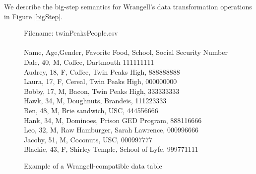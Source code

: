 \documentclass[preprint,nocopyrightspace]{sig-alternate}
\begin{document}
We describe the big-step semantics for Wrangell's data transformation operations in Figure \ref{bigStep}.

\onecolumn

\begin{figure}
\caption{Example of a Wrangell-compatible data table}
Filename: twinPeaksPeople.csv
\\\\
Name,   Age,Gender,	Favorite Food,	School,				Social Security Number \\
Dale,   40,	M,		Coffee,			Dartmouth			111111111\\
Audrey, 18,	F,		Coffee,			Twin Peaks High,	888888888\\
Laura,  17,	F,		Cereal,			Twin Peaks High,	000000000\\
Bobby,  17,	M,		Bacon,			Twin Peaks High,	333333333\\
Hawk,   34,	M,		Doughnuts,		Brandeis,			111223333\\
Ben,    48,	M,		Brie sandwich,	USC,				444556666\\
Hank,   34,	M,		Dominoes,		Prison GED Program,	888116666\\
Leo,    32,	M,		Raw Hamburger,	Sarah Lawrence,		000996666\\
Jacoby,  51, M,		Coconuts,		USC,				000997777\\
Blackie,	43, F,	Shirley Temple,	School of Lyfe,		999771111\\	
\label{exampleTable}	
\end{figure} 
\end{document}
